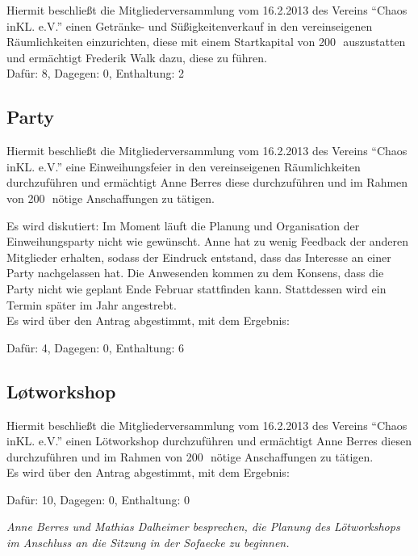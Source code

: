 \documentclass{scrartcl}
\begin{document}
Hiermit beschließt die Mitgliederversammlung vom 16.2.2013 des
Vereins ``Chaos inKL. e.V.'' einen Getränke- und Süßigkeitenverkauf in
den vereinseigenen Räumlichkeiten einzurichten, diese mit einem
Startkapital von 200\officialeuro\,\, auszustatten und ermächtigt Frederik Walk dazu,
diese zu führen.\\

Dafür: 8, Dagegen: 0, Enthaltung: 2

\subsection*{Party}

Hiermit beschließt die Mitgliederversammlung vom 16.2.2013 des
Vereins ``Chaos inKL. e.V.'' eine Einweihungsfeier in den
vereinseigenen Räumlichkeiten durchzuführen und ermächtigt Anne
Berres diese durchzuführen und im Rahmen von 200\officialeuro\,\, nötige
Anschaffungen zu tätigen.

Es wird diskutiert:
Im Moment läuft die Planung und Organisation der Einweihungsparty nicht wie gewünscht.
Anne hat zu wenig Feedback der anderen Mitglieder erhalten, sodass der Eindruck entstand, dass das Interesse an einer Party nachgelassen hat.
Die Anwesenden kommen zu dem Konsens, dass die Party nicht wie geplant Ende Februar stattfinden kann.
Stattdessen wird ein Termin später im Jahr angestrebt.\\

Es wird über den Antrag abgestimmt, mit dem Ergebnis: 

Dafür: 4, Dagegen: 0, Enthaltung: 6

\subsection*{Løtworkshop}

Hiermit beschließt die Mitgliederversammlung vom 16.2.2013 des
Vereins ``Chaos inKL. e.V.'' einen Lötworkshop durchzuführen und
ermächtigt Anne Berres diesen durchzuführen und im Rahmen von 200\officialeuro\,\,
nötige Anschaffungen zu tätigen.\\

Es wird über den Antrag abgestimmt, mit dem Ergebnis: 

Dafür: 10, Dagegen: 0, Enthaltung: 0

\emph{Anne Berres und Mathias Dalheimer besprechen, die Planung des Lötworkshops im Anschluss an die Sitzung in der Sofaecke zu beginnen.}
\end{document}
